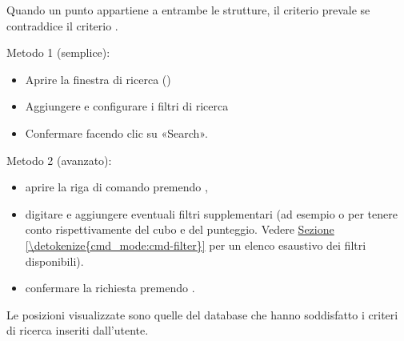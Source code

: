 \documentclass[letterpaper,10pt,italian]{sphinxmanual}
\begin{document}
\sphinxAtStartPar
Quando un punto appartiene a entrambe le strutture, il criterio  prevale se contraddice il criterio .

\sphinxAtStartPar
Metodo 1 (semplice):
\begin{itemize}
\item {} 
\sphinxAtStartPar
Aprire la finestra di ricerca ()

\item {} 
\sphinxAtStartPar
Aggiungere e configurare i filtri di ricerca

\item {} 
\sphinxAtStartPar
Confermare facendo clic su «Search».

\end{itemize}

\sphinxAtStartPar
Metodo 2 (avanzato):
\begin{itemize}
\item {} 
\sphinxAtStartPar
aprire la riga di comando premendo ,

\item {} 
\sphinxAtStartPar
digitare  e aggiungere eventuali filtri supplementari (ad esempio  o  per tenere conto rispettivamente del cubo e del punteggio. Vedere \hyperref[\detokenize{cmd_mode:cmd-filter}]{Sezione \ref{\detokenize{cmd_mode:cmd-filter}}} per un elenco esaustivo dei filtri disponibili).

\item {} 
\sphinxAtStartPar
confermare la richiesta premendo .

\end{itemize}

\sphinxAtStartPar
Le posizioni visualizzate sono quelle del database che hanno soddisfatto i criteri di ricerca inseriti dall’utente.
\end{document}
